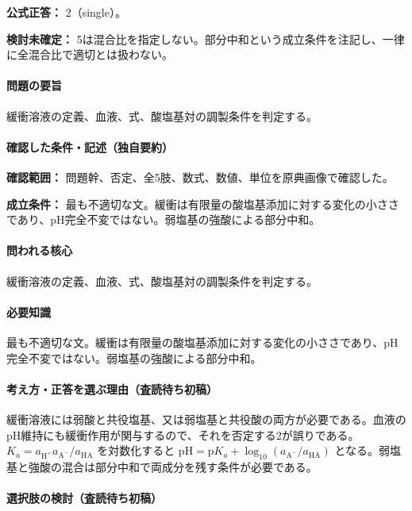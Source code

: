 \textbf{公式正答：} 2（single）。

\par\textbf{検討未確定：} 5は混合比を指定しない。部分中和という成立条件を注記し、一律に全混合比で適切とは扱わない。

\paragraph{問題の要旨} 緩衝溶液の定義、血液、式、酸塩基対の調製条件を判定する。

\paragraph{確認した条件・記述（独自要約）}\mbox{}\par

\noindent\textbf{確認範囲：} 問題幹、否定、全5肢、数式、数値、単位を原典画像で確認した。\par

\noindent\textbf{成立条件：} 最も不適切な文。緩衝は有限量の酸塩基添加に対する変化の小ささであり、pH完全不変ではない。弱塩基の強酸による部分中和。\par

\paragraph{問われる核心} 緩衝溶液の定義、血液、式、酸塩基対の調製条件を判定する。

\paragraph{必要知識} 最も不適切な文。緩衝は有限量の酸塩基添加に対する変化の小ささであり、pH完全不変ではない。弱塩基の強酸による部分中和。

\paragraph{考え方・正答を選ぶ理由（査読待ち初稿）} 緩衝溶液には弱酸と共役塩基、又は弱塩基と共役酸の両方が必要である。血液のpH維持にも緩衝作用が関与するので、それを否定する2が誤りである。\(K_a=a_{\mathrm{H^+}}a_{\mathrm{A^-}}/a_{\mathrm{HA}}\) を対数化すると \(\mathrm{pH=p}K_a+\log_{10}(a_{\mathrm{A^-}}/a_{\mathrm{HA}})\) となる。弱塩基と強酸の混合は部分中和で両成分を残す条件が必要である。

\paragraph{選択肢の検討（査読待ち初稿）}\mbox{}\par

